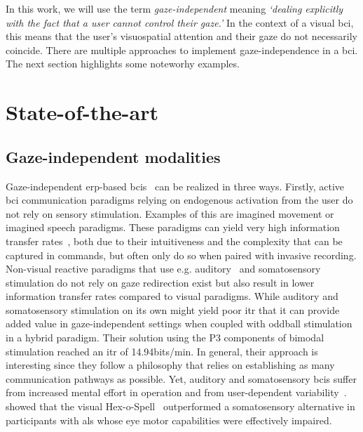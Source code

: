 In this work, we will use the term \emph{gaze-independent} meaning
\emph{‘dealing explicitly with the fact that a user cannot control their
gaze.'}
In the context of a visual \ac{bci}, this means that the user's
visuospatial attention and their gaze do not necessarily coincide.
There are multiple approaches to implement gaze-independence in a \ac{bci}.
The next section highlights some noteworhy examples.

\section{State-of-the-art}
\label{sec:gaze-independence/sota}

\subsection{Gaze-independent modalities}
Gaze-independent \ac{erp}-based \ac{bci}s~\cite{Riccio2012, Aloise2012} can be realized in three
ways.
Firstly, active \ac{bci} communication paradigms relying on endogenous activation from the user
do not rely on sensory stimulation.
Examples of this are imagined movement or imagined speech paradigms.
These paradigms can yield very high information transfer
rates~\cite{Willett2021,Metzger2023}, both due to their intuitiveness and the
complexity that can be captured in commands, but often only do so when paired
with invasive recording.
Non-visual reactive paradigms that use e.g. auditory~\cite{Halder2010} and
somatosensory~\cite{Brouwer2010}
stimulation do not rely on gaze redirection exist but also result in lower information transfer
rates compared to visual paradigms.
While auditory and somatosensory stimulation on its own might yield poor
\ac{itr} \textcite{Yin2016} that it can provide added value in gaze-independent
settings when coupled with oddball stimulation in a hybrid paradigm.
Their solution using the P3 components of bimodal stimulation reached an \ac{itr} of 14.94bits/min.
In general, their approach is interesting since they follow a philosophy that
relies on establishing as many communication pathways as possible.
Yet, auditory and somatosensory \acp{bci} suffer from increased mental effort in
operation and from user-dependent variability~\cite{Severens2014,Reichert2020b}.
\textcite{Severens2014} showed that the visual Hex-o-Spell~\cite{Treder2010}
outperformed a somatosensory alternative in participants with \ac{als} whose
eye motor capabilities were effectively impaired.


